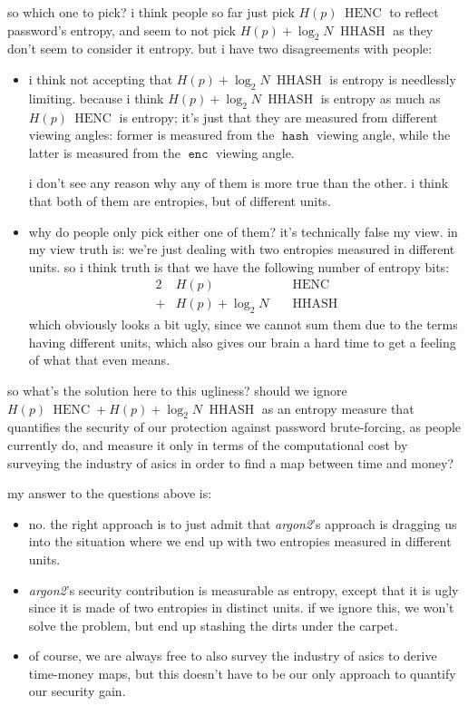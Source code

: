 \documentclass[twocolumn]{article}
\DeclareMathOperator{\enc}{\mathtt{enc}}
\DeclareMathOperator{\hash}{\mathtt{hash}}
\DeclareMathOperator{\henc}{\; HENC}
\DeclareMathOperator{\hhash}{\; HHASH}
\begin{document}
so which one to pick?  i think people so far just pick $H(p) \henc$ to
reflect password's entropy, and seem to not pick $H(p) + \log_2 N \hhash$
as they don't seem to consider it entropy.  but i have two disagreements
with people:
\begin{itemize}
    \item i think not accepting that $H(p) + \log_2 N \hhash$ is entropy is
    needlessly limiting.  because i think $H(p) + \log_2 N \hhash$ is
    entropy as much as $H(p) \henc$ is entropy; it's just that they are
    measured from different viewing angles:  former is measured from the
    $\hash$ viewing angle, while the latter is measured from the $\enc$
    viewing angle.

    i don't see any reason why any of them is more true than the other.  i
    think that both of them are entropies, but of different units.

    \item why do people only pick either one of them?  it's technically
    false my view.  in my view truth is:  we're just dealing with two
    entropies measured in different units.  so i think truth is that we
    have the following number of entropy bits:
    \begin{alignat}{2}
            & H(p)              && \henc \\
        +{} & H(p) + \log_2 N   && \hhash 
    \end{alignat}
    which obviously looks a bit ugly, since we cannot sum them due to the
    terms having different units, which also gives our brain a hard time to
    get a feeling of what that even means.
\end{itemize}

so what's the solution here to this ugliness?  should we ignore $H(p)\henc
+ H(p)+\log_2N\hhash$ as an entropy measure that quantifies the security of
our protection against password brute-forcing, as people currently do, and
measure it only in terms of the computational cost by surveying the
industry of asics in order to find a map between
time and money?

my answer to the questions above is:  
\begin{itemize}
    \item no.  the right approach is to just admit that \emph{argon2}'s
    approach is dragging us into the situation where we end up with two
    entropies measured in different units.
    \item \emph{argon2}'s security contribution is measurable as entropy,
    except that it is ugly since it is made of two entropies in distinct
    units.  if we ignore this, we won't solve the problem, but end up
    stashing the dirts under the carpet.
    \item of course, we are always free to also survey the industry of
    asics to derive time-money maps, but this doesn't have to be our only
    approach to quantify our security gain.
\end{itemize}
\end{document}
